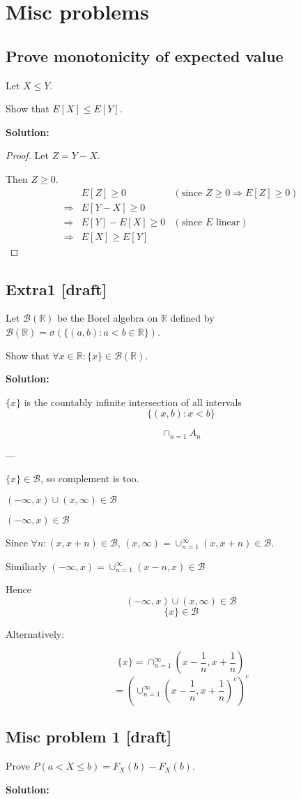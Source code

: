 \documentclass{article}
\begin{document}
\section{Misc problems}
\subsection{Prove monotonicity of expected value}
Let \(X\leq Y\).

Show that \(E[X]\leq E[Y]\).

\textbf{Solution:}

\begin{proof}
Let \(Z=Y-X\).

Then \(Z\geq 0\).
\begin{align*}
     & E[Z]\geq 0 & (\text{since }Z\geq 0 \Rightarrow E[Z]\geq 0) \\
    \Rightarrow& E[Y-X] \geq 0 \\
    \Rightarrow& E[Y]-E[X] \geq 0 & (\text{since }E\text{ linear}) \\
    \Rightarrow& E[X]\geq E[Y]
\end{align*}
\end{proof}

\subsection{Extra1 [draft]}

Let \(\mathcal{B}(\mathbb{R})\) be the Borel algebra on \(\mathbb{R}\)
defined by \(\mathcal{B}(\mathbb{R})=\sigma(\{(a,b): a<b \in \mathbb{R}\})\).

Show that \(\forall x \in \mathbb{R}:\{x\}\in \mathcal{B}(\mathbb{R})\).

\textbf{Solution:}

\(\{x\}\) is the countably infinite intersection of all intervals
\[\{(x,b):x<b\}\]

\[\cap_{n=1} A_n \]

---

\(\{x\} \in \mathcal{B}\), so complement is too.

\((-\infty,x)\cup (x,\infty)\in \mathcal{B}\)

\((-\infty,x)\in \mathcal{B}\)

Since \(\forall n: (x,x+n)\in \mathcal{B}\),
\((x,\infty)=\cup_{n=1}^\infty(x,x+n)\in \mathcal{B}\).

Similiarly
\((-\infty,x)=\cup_{n=1}^\infty (x-n,x)\in\mathcal{B}\)

Hence
\[(-\infty,x)\cup (x,\infty)\in \mathcal{B}\]
\[\{x\}\in \mathcal{B}\]

Alternatively:

\[\{x\} = \cap_{n=1}^{\infty} (x-\frac{1}{n}, x+\frac{1}{n})\]
\[= (\cup_{n=1}^{\infty} (x-\frac{1}{n}, x+\frac{1}{n})^c)^c\]

\subsection{Misc problem 1 [draft]}

Prove \(P(a < X \leq b) = F_X(b)-F_X(b)\).

\textbf{Solution:}
\end{document}

